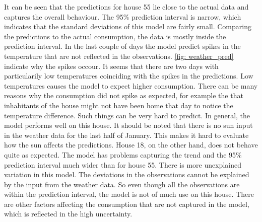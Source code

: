 \noindent It can be seen that the predictions for house 55 lie close to the actual data and captures the overall behaviour.  The 95\% prediction interval is narrow, which indicates that the standard deviations of this model are fairly small. Comparing the predictions to the actual consumption, the data is mostly inside the prediction interval. In the last couple of days the model predict spikes in the temperature that are not reflected in the observations. \cref{fig: weather_pred} indicate why the spikes occour. It seems that there are two days with particularily low temperatures coinciding with the spikes in the predictions. Low temperatures causes the model to expect higher consumption. There can be many reasons why the consumption did not spike as expected, for example the that inhabitants of the house might not have been home that day to notice the temperature difference. Such things can be very hard to predict. In general, the model performs well on this house. It should be noted that there is no sun input in the weather data for the last half of January. This makes it hard to evaluate how the sun affects the predictions. House 18, on the other hand, does not behave quite as expected. The model has problems capturing the trend and the 95\% prediction interval much wider than for house 55. There is more unexplained variation in this model. The deviations in the observations cannot be explained by the input from the weather data. So even though all the observations are within the prediction interval, the model is not of much use on this house. There are other factors affecting the consumption that are not captured in the model, which is reflected in the high uncertainty.\\
